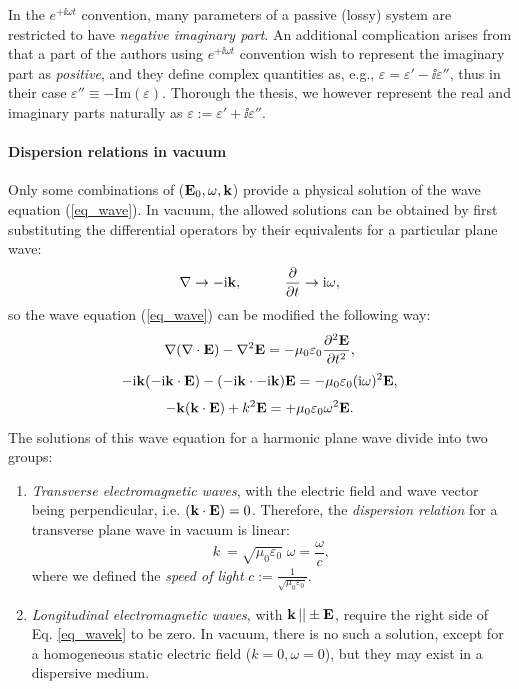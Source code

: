 In the $e^{+\ii\omega t}$ convention, many parameters of a passive (lossy) system are restricted to have \textit{negative imaginary part}.  An additional complication arises from that a part of the authors using $e^{+\ii\omega t}$ convention wish to represent the imaginary part as \textit{positive}, and they define complex quantities as, e.g., $\varepsilon = \varepsilon' - \ii \varepsilon''$, %
thus in their case $\varepsilon''\equiv -\text{Im}(\varepsilon)$. Thorough the thesis, we however represent the real and imaginary parts naturally as $\varepsilon := \varepsilon' + \ii \varepsilon'' $.
\paragraph{Dispersion relations in vacuum} %
Only some combinations of ($\mathbf{E}_0, \omega, {\mathbf{k}}$) provide a physical solution of the wave equation (\ref{eq_wave}). In vacuum, the allowed solutions can be obtained by first substituting the differential operators by their equivalents for a particular plane wave: %
\begin{equation} \nabla \rightarrow -{\mathrm i}{\mathbf{k}}, \quad\quad\quad 
\frac{\partial} {\partial t} \rightarrow {\mathrm i}\omega, \label{eq_difftok}\end{equation}
so the wave equation (\ref{eq_wave}) can be modified the following way:
$$					\nabla (\nabla \cdot \mathbf{E}) - \nabla^2 \mathbf{E}				  =	-\mu_0 \varepsilon_0 \frac{\partial^{2} \mathbf{E}}{\partial t^{2}},  $$
$$				 -{\mathrm i}{\mathbf{k}} (-{\mathrm i}{\mathbf{k}} \cdot \mathbf{E})  - (-{\mathrm i}{\mathbf{k}} \cdot -{\mathrm i}{\mathbf{k}}) \mathbf{E} = -\mu_0 \varepsilon_0 ({\mathrm i}\omega)^2 \mathbf{E}, $$
\begin{equation}   - {\mathbf{k}} ({\mathbf{k}} \cdot \mathbf{E})      +          k^2 \mathbf{E}            = +\mu_0 \varepsilon_0 \omega^{2} \mathbf{E}.  \label{eq_wavek}\end{equation}
The solutions of this wave equation for a harmonic plane wave divide into two groups: %
\begin{enumerate}
 \item{\textit{Transverse electromagnetic waves}, with the electric field and wave vector being perpendicular, i.e. $({\mathbf{k}} \cdot \mathbf{E}) = 0$. Therefore, the \textit{dispersion relation} for a transverse plane wave in vacuum is linear:
\begin{equation} k~= \sqrt{\mu_0 \varepsilon_0}\; \omega = \frac{\omega}{c}, \label{eq_dispeq_vac}\end{equation}
where we defined the \textit{speed of light} $c := \frac{1}{\sqrt{\mu_0 \varepsilon_0}}$.
} 
 \item{\textit{Longitudinal electromagnetic waves}, with ${\mathbf{k}}\,|| \pm \mathbf{E}$, require the right side of Eq. \ref{eq_wavek} to be zero. In vacuum, there is no such a solution, except for a homogeneous static electric field ($k = 0, \omega = 0$), but they may exist in a dispersive medium.} 
 \end{enumerate}

